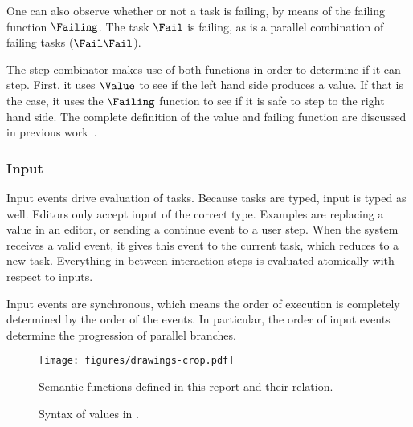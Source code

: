 One can also observe whether or not a task is failing, by means of the failing function $\Failing$.
The task $\Fail$ is failing, as is a parallel combination of failing tasks ($\Fail \And \Fail$).

The step combinator makes use of both functions in order to determine if it can step.
First, it uses $\Value$ to see if the left hand side produces a value.
If that is the case, it uses the $\Failing$ function to see if it is safe to step to the right hand side.
The complete definition of the value and failing function are discussed in previous work~\cite{Steenvoorden2019}.


\subsubsection{Input}

Input events drive evaluation of tasks.
Because tasks are typed, input is typed as well.
Editors only accept input of the correct type.
Examples are replacing a value in an editor,
or sending a continue event to a user step.
When the system receives a valid event, it gives this event to the current task, which reduces to a new task.
Everything in between interaction steps is evaluated atomically with respect to inputs.

Input events are synchronous, which means the order of execution is completely determined by the order of the events.
In particular, the order of input events determine the progression of parallel branches.


\begin{figure}[h]
  \centering
  \texttt{[image: figures/drawings-crop.pdf]}
  \caption{
    Semantic functions defined in this report and their relation.
  }
  \label{fig:semantic-functions}
\end{figure}

\boxed{\RelationE}
\boxed{\RelationS}
\boxed{\RelationN}
\boxed{\RelationH}
\boxed{\RelationI}

\begin{figure}[ht]
  \small
  \caption{Syntax of values in \TOPHAT.}
  \label{fig:syntaxvalues}
\end{figure}
